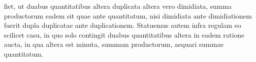 fiet, ut duabus quantitatibus altera duplicata  
altera vero dimidiata, summa productorum
eadem sit quae ante quantitatum, nisi dimidiata
ante dimidiationem fuerit dupla duplicatae
ante duplicationem. Statuemus autem infra
regulam\protect{}
eo scilicet casu, in quo solo contingit duabus
quantitatibus altera in eadem ratione aucta,
in qua altera est minuta, summam productorum,
aequari summae quantitatum.
\pend
\count{}
\count{}
\count{}
%

